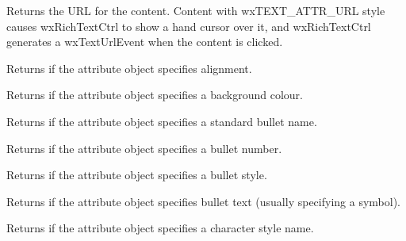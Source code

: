 Returns the URL for the content. Content with wxTEXT\_ATTR\_URL style
causes wxRichTextCtrl to show a hand cursor over it, and wxRichTextCtrl generates
a wxTextUrlEvent when the content is clicked.

\label{wxrichtextattrhasalignment}


Returns \true if the attribute object specifies alignment.

\label{wxrichtextattrhasbackgroundcolour}


Returns \true if the attribute object specifies a background colour.

\label{wxrichtextattrhasbulletname}


Returns \true if the attribute object specifies a standard bullet name.

\label{wxrichtextattrhasbulletnumber}


Returns \true if the attribute object specifies a bullet number.

\label{wxrichtextattrhasbulletstyle}


Returns \true if the attribute object specifies a bullet style.

\label{wxrichtextattrhasbullettext}


Returns \true if the attribute object specifies bullet text (usually specifying a symbol).

\label{wxrichtextattrhascharacterstylename}


Returns \true if the attribute object specifies a character style name.

\label{wxrichtextattrhasfacename}


